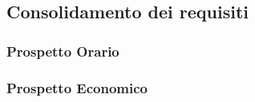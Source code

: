 \subsection{Consolidamento dei requisiti}

\subsubsection{Prospetto Orario}

\subsubsection{Prospetto Economico}

\pagebreak